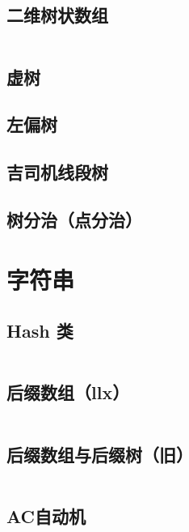 \documentclass[12pt, a4paper, oneside]{ctexart}
\begin{document}
\begin{multicols}{2}
        \subsection{二维树状数组}
        \inputminted{cpp}{src/data structure/2D-BIT.cpp}
        \subsection{虚树}
        
        \subsection{左偏树}
        
        \subsection{吉司机线段树}
        
        \subsection{树分治（点分治）}
        
        
        \newpage

        
        \section{字符串}
        \subsection{Hash 类}
        \inputminted{cpp}{src/string/hash.cpp}
        \subsection{后缀数组（llx）}
        \inputminted{cpp}{src/string/llx_SA.cpp}
        \subsection{后缀数组与后缀树（旧）}
        \inputminted{cpp}{src/string/SA.cpp}
        \subsection{AC自动机}
        \inputminted{cpp}{src/string/ACAM.cpp}

\end{multicols}
\end{document}

